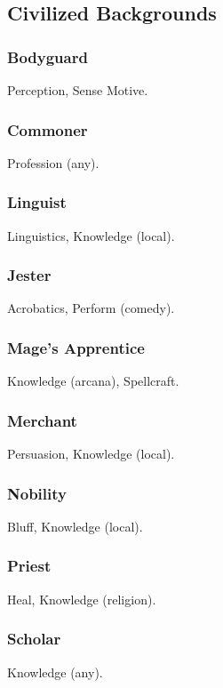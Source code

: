 \subsection{Civilized Backgrounds}

\subsubsection{Bodyguard}
 Perception, Sense Motive.

\subsubsection{Commoner}
 Profession (any).

\subsubsection{Linguist}
 Linguistics, Knowledge (local).

\subsubsection{Jester}
 Acrobatics, Perform (comedy).

\subsubsection{Mage's Apprentice}
 Knowledge (arcana), Spellcraft.

\subsubsection{Merchant}
 Persuasion, Knowledge (local).

\subsubsection{Nobility}
 Bluff, Knowledge (local).

\subsubsection{Priest}
 Heal, Knowledge (religion).

\subsubsection{Scholar}
 Knowledge (any).

